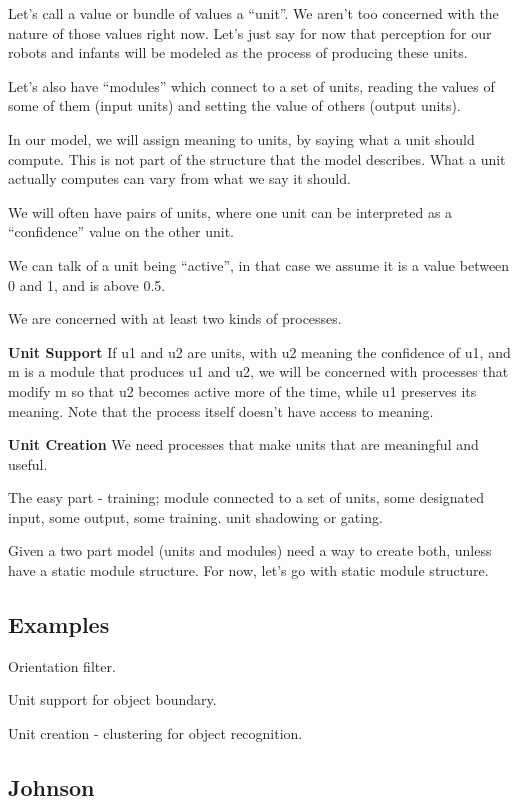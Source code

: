 
Let's call a value or bundle of values a ``unit''.  We aren't
too concerned with the nature of those values right now.  Let's 
just say for now that perception for our robots and infants will
be modeled as the process of producing these units.

Let's also have ``modules'' which connect to a set of units,
reading the values of some of them (input units) and setting
the value of others (output units).

In our model, we will assign meaning to units, by saying
what a unit should compute.  This is not part of the
structure that the model describes.  What a unit actually
computes can vary from what we say it should.

We will often have pairs of units, where one unit can
be interpreted as a ``confidence'' value on the other unit.

We can talk of a unit being ``active'', in that case we
assume it is a value between 0 and 1, and is above 0.5.

We are concerned with at least two kinds of processes.

{\bf Unit Support}  If u1 and u2 are units,
with u2 meaning the confidence of u1,
and m is a module that produces u1 and u2,
we will be concerned with processes that modify
m so that u2 becomes active more of the time,
while u1 preserves its meaning.  Note that 
the process itself doesn't have access to meaning.

{\bf Unit Creation} We need processes that
make units that are meaningful and useful.

The easy part - training; module connected to a set of units,
some designated input, some output, some training.  unit 
shadowing or gating.

Given a two part model (units and modules) need a way to 
create both, unless have a static module structure.  For now,
let's go with static module structure.


\subsection{Examples}

Orientation filter.

Unit support for object boundary.

Unit creation - clustering for object recognition.


\subsection{Johnson}

